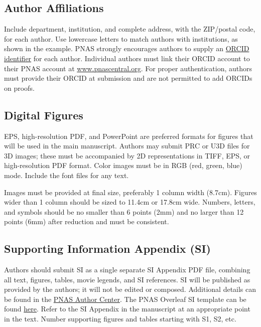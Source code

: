 \documentclass[9pt,twocolumn,twoside]{pnas-new}
\begin{document}
\subsection*{Author Affiliations}

Include department, institution, and complete address, with the ZIP/postal code, for each author. Use lowercase letters to match authors with institutions, as shown in the example. PNAS strongly encourages authors to supply an \href{https://orcid.org/}{ORCID identifier} for each author. Individual authors must link their ORCID account to their PNAS account at \href{http://www.pnascentral.org/}{www.pnascentral.org}. For proper authentication, authors must provide their ORCID at submission and are not permitted to add ORCIDs on proofs.

%


\subsection*{Digital Figures}

EPS, high-resolution PDF, and PowerPoint are preferred formats for figures that will be used in the main manuscript. Authors may submit PRC or U3D files for 3D images; these must be accompanied by 2D representations in TIFF, EPS, or high-resolution PDF format. Color images must be in RGB (red, green, blue) mode. Include the font files for any text.

Images must be provided at final size, preferably 1 column width (8.7cm). Figures wider than 1 column should be sized to 11.4cm or 17.8cm wide. Numbers, letters, and symbols should be no smaller than 6 points (2mm) and no larger than 12 points (6mm) after reduction and must be consistent.



\subsection*{Supporting Information Appendix (SI)}

Authors should submit SI as a single separate SI Appendix PDF file, combining all text, figures, tables, movie legends, and SI references. SI will be published as provided by the authors; it will not be edited or composed. Additional details can be found in the \href{https://www.pnas.org/authors/submitting-your-manuscript#manuscript-formatting-guidelines}{PNAS Author Center}. The PNAS Overleaf SI template can be found \href{https://www.overleaf.com/latex/templates/pnas-template-for-supplementary-information/wqfsfqwyjtsd}{here}. Refer to the SI Appendix in the manuscript at an appropriate point in the text. Number supporting figures and tables starting with S1, S2, etc.
\end{document}
